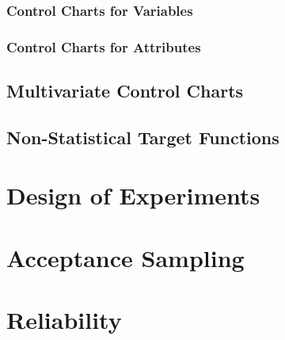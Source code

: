 \documentclass[12pt,a4paper]{report}
\begin{document}
\subsection{Control Charts for Variables}
\subsection{Control Charts for Attributes}



\section{Multivariate Control Charts}


\section{Non-Statistical Target Functions}



\chapter{Design of Experiments}


\chapter{Acceptance Sampling}


\chapter{Reliability}

\newpage

\appendix





\newpage
{}


%
\label{sec:bibliography}
\end{document}
